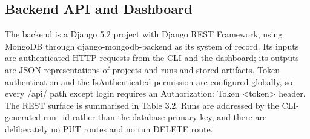 \documentclass[12pt,a4paper,oneside]{report}
\begin{document}
\subsection{Backend API and Dashboard}\label{backend-api-and-dashboard}

The backend is a Django 5.2 project with Django REST Framework, using MongoDB through django-mongodb-backend as its system of record. Its inputs are authenticated HTTP requests from the CLI and the dashboard; its outputs are JSON representations of projects and runs and stored artifacts. Token authentication and the IsAuthenticated permission are configured globally, so every /api/ path except login requires an Authorization: Token <token> header. The REST surface is summarised in Table 3.2. Runs are addressed by the CLI-generated run\_id rather than the database primary key, and there are deliberately no PUT routes and no run DELETE route.
\end{document}
